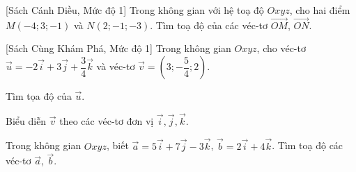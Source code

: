 \begin{bt}%
[Sách Cánh Diều, Mức độ 1]%
	Trong không gian với hệ toạ độ $Oxyz$, cho hai điểm $M(-4;3;-1)$ và $N(2;-1;-3)$. Tìm toạ độ của các véc-tơ $\overrightarrow{OM}$, $\overrightarrow{ON}$.
\end{bt}

\begin{bt}%
[Sách Cùng Khám Phá, Mức độ 1]%
	Trong không gian $Oxyz$, cho véc-tơ $\overrightarrow{u}=-2 \overrightarrow{i}+3 \overrightarrow{j}+\dfrac{3}{4} \overrightarrow{k}$ và véc-tơ $\overrightarrow{v}=\left(3;-\dfrac{5}{4}; 2\right)$.
	\begin{listEX}[1]
		\item Tìm tọa độ của $\overrightarrow{u}$.
		\item Biểu diễn $\overrightarrow{v}$ theo các véc-tơ đơn vị $\overrightarrow{i}, \overrightarrow{j}, \overrightarrow{k}$.
	\end{listEX}
\end{bt}

\begin{bt}%
	Trong không gian $Oxyz$, biết $\overrightarrow{a}=5\overrightarrow{i}+7\overrightarrow{j}-3\overrightarrow{k}$, $\overrightarrow{b}=2\overrightarrow{i}+4\overrightarrow{k}$. Tìm toạ độ các véc-tơ $\overrightarrow{a}$, $\overrightarrow{b}$.
\end{bt}

